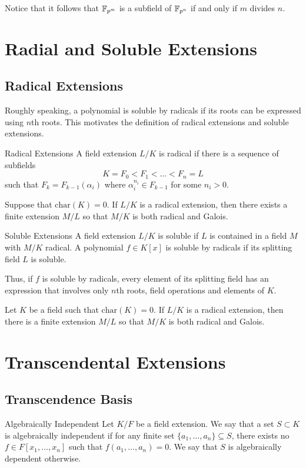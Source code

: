 \documentclass[a4paper]{article}
\begin{document}
Notice that it follows that $\mathbb{F}_{p^m}$ is a subfield of $\mathbb{F}_{p^n}$ if and only if $m$ divides $n$. 

\pagebreak
\section{Radial and Soluble Extensions}
\subsection{Radical Extensions}
Roughly speaking, a polynomial is soluble by radicals if its roots can be expressed using $n$th roots. This motivates the definition of radical extensions and soluble extensions. 

\begin{defn}{Radical Extensions}{} A field extension $L/K$ is radical if there is a sequence of subfields $$K=F_0<F_1<\dots<F_n=L$$ such that $F_k=F_{k-1}(\alpha_i)$ where $\alpha_i^{n_i}\in F_{k-1}$ for some $n_i>0$. 
\end{defn}

\begin{prp}{}{} Suppose that $\text{char}(K)=0$. If $L/K$ is a radical extension, then there exists a finite extension $M/L$ so that $M/K$ is both radical and Galois. 
\end{prp}

\begin{defn}{Soluble Extensions}{} A field extension $L/K$ is soluble if $L$ is contained in a field $M$ with $M/K$ radical. A polynomial $f\in K[x]$ is soluble by radicals if its splitting field $L$ is soluble. 
\end{defn}

Thus, if $f$ is soluble by radicals, every element of its splitting field has an expression that involves only $n$th roots, field operations and elements of $K$. 

\begin{prp}{}{} Let $K$ be a field such that $\text{char}(K)=0$. If $L/K$ is a radical extension, then there is a finite extension $M/L$ so that $M/K$ is both radical and Galois. 
\end{prp}

\pagebreak
\section{Transcendental Extensions}
\subsection{Transcendence Basis}
\begin{defn}{Algebraically Independent}{} Let $K/F$ be a field extension. We say that a set $S\subset K$ is algebraically independent if for any finite set $\{a_1,\dots,a_n\}\subseteq S$, there exists no $f\in F[x_1,\dots,x_n]$ such that $f(a_1,\dots,a_n)=0$. We say that $S$ is algebraically dependent otherwise. 
\end{defn}
\end{document}
